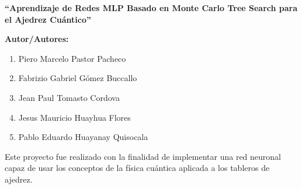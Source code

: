 
\begin{center}
    \textbf{\textcolor{pucpVerde}{\huge ``Aprendizaje de Redes MLP Basado en Monte Carlo Tree Search para el Ajedrez Cuántico''}}
\end{center}


\textcolor{pucpVerde}{\textbf{Autor/Autores:}}

\begin{center}
	\begin{minipage}{0.75\textwidth}
		\begin{enumerate}
			\item Piero Marcelo Pastor Pacheco
			\item Fabrizio Gabriel Gómez  Buccallo 
			\item Jean Paul Tomasto Cordova 
			\item Jesus Mauricio Huayhua Flores 
			\item Pablo Eduardo Huayanay Quisocala 
		\end{enumerate}
	\end{minipage}
\end{center}



\begin{center}
\begin{minipage}{0.85\textwidth}
\noindent
Este proyecto fue realizado con la finalidad de implementar una red neuronal capaz de usar los conceptos de la física cuántica aplicada a los tableros de ajedrez.
\end{minipage}
\end{center}


